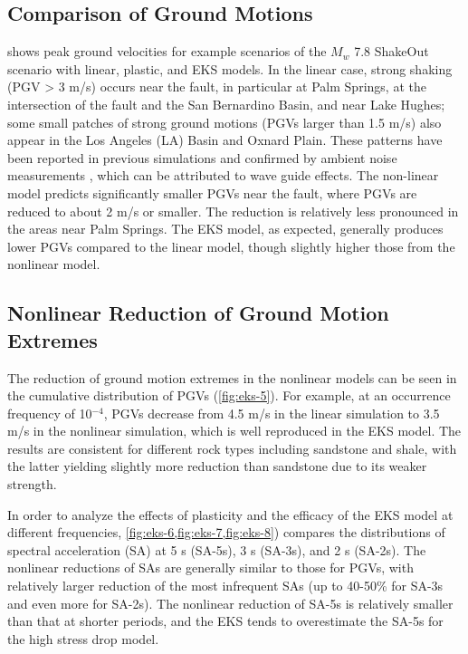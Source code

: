 \subsection{Comparison of Ground Motions}
 shows peak ground velocities for example scenarios of the $M_w$ 7.8 ShakeOut scenario with linear, plastic, and EKS models. In the linear case, strong shaking (PGV > 3 m/s) occurs near the fault, in particular at Palm Springs, at the intersection of the fault and the San Bernardino Basin, and near Lake Hughes; some small patches of strong ground motions (PGVs larger than 1.5 m/s) also appear in the Los Angeles (LA) Basin and Oxnard Plain. These patterns have been reported in previous simulations \citep{olsen2009shakeout} and confirmed by ambient noise measurements \citep{denolle2014strong}, which can be attributed to wave guide effects. The non-linear model predicts significantly smaller PGVs near the fault, where PGVs are reduced to about 2 m/s or smaller. The reduction is relatively less pronounced in the areas near Palm Springs. The EKS model, as expected, generally produces lower PGVs compared to the linear model, though slightly higher those from the nonlinear model.

\subsection{Nonlinear Reduction of Ground Motion Extremes}
The reduction of ground motion extremes in the nonlinear models can be seen in the cumulative distribution of PGVs (\cref{fig:eks-5}). For example, at an occurrence frequency of 10$^{-4}$, PGVs decrease from 4.5 m/s in the linear simulation to 3.5 m/s in the nonlinear simulation, which is well reproduced in the EKS model. The results are consistent for different rock types including sandstone and shale, with the latter yielding slightly more reduction than sandstone due to its weaker strength.

In order to analyze the effects of plasticity and the efficacy of the EKS model at different frequencies, \cref{fig:eks-6,fig:eks-7,fig:eks-8}) compares the distributions of spectral acceleration (SA) at 5 s (SA-5s), 3 s (SA-3s), and 2 s (SA-2s). The nonlinear reductions of SAs are generally similar to those for PGVs, with relatively larger reduction of the most infrequent SAs (up to 40-50\% for SA-3s and even more for SA-2s). The nonlinear reduction of SA-5s is relatively smaller than that at shorter periods, and the EKS tends to overestimate the SA-5s for the high stress drop model.

